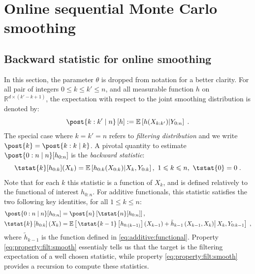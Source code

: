 \documentclass{article}
\newcommand{\parvec}{\theta}
\newcommand{\af}[1]{h_{#1}}
\newcommand{\addf}[1]{\termletter_{#1}}
\newcommand{\termletter}{\tilde{h}}
\def\pE{\mathbb{E}}
\newcommand{\rset}{\ensuremath{\mathbb{R}}}
\newcommand{\eqsp}{\;}
\begin{document}
\section{Online sequential Monte Carlo smoothing}
\label{sec:method}

\subsection{Backward statistic for online smoothing}

In this section, the parameter $\parvec$ is dropped from notation for a better clarity. For all pair of integers $0\leq k \leq k' \leq n$, and all measurable function $h$ on $\rset^{d \times (k' - k + 1)}$, the expectation with respect to the joint smoothing distribution is denoted by:
$$
\post{k:k' \mid n} \left[ h \right] := \pE\left[ h(X_{k:k'}) \middle | Y_{0:n} \right]\eqsp .
$$
The special case where $k = k' = n$ refers to \textit{filtering distribution} and we write $\post{k} = \post{k:k \mid k}$.
A pivotal quantity to estimate $\post{0:n \mid n}[\af{0:n}]$ is the \textit{backward statistic}:
\begin{equation}
\label{eq:T:stat}
\tstat{k}[\af{0:k}](X_k) = \pE \left[\af{0:k}(X_{0:k        }) \middle | X_k, Y_{0:k}\right],~1\leqslant k \leqslant n,~\tstat{0} = 0\eqsp.
\end{equation}
Note that for each $k$ this statistic is a function of $X_k$, and is defined relatively to the functional of interest $\af{0:n}$.
For additive functionals, this statistic satisfies the two following key identities, for all $1\leqslant k \leqslant n$:
\begin{align}
\post{0:n \mid n}[\af{0:n}] &= \post{n}\left[\tstat{n}[\af{0:n}] \right], \label{eq:property:filt:smooth}\\
\tstat{k}\left[\af{0:k}\right](X_{k}) &= \pE\left[\left.\tstat{k-1}\left[\af{0:(k-1)}\right]\left(X_{k-1}\right) + \addf{k-1}\left(X_{k-1},X_{k}\right)\right|X_{k},Y_{0:k-1} \right]\eqsp, \label{eq:property:backward}
\end{align} 
where $\addf{k-1}$ is the function defined in \eqref{eq:additive:functional}.
Property \eqref{eq:property:filt:smooth} essentialy tells us that the target is the filtering expectation of a well chosen statistic, while property \eqref{eq:property:filt:smooth} provides a recursion to compute these statistics. 
\end{document}
